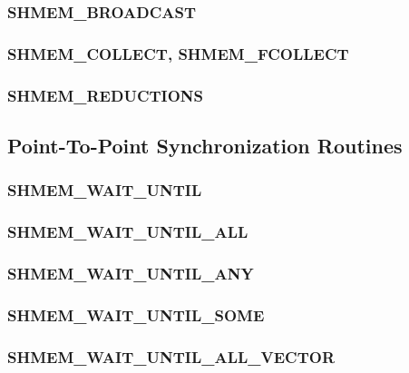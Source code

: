 \documentclass[10pt,oneside]{book}
\begin{document}
\subsubsection{\textbf{SHMEM\_BROADCAST}}\label{subsec:shmem_broadcast}


\subsubsection{\textbf{SHMEM\_COLLECT, SHMEM\_FCOLLECT}}\label{subsec:shmem_collect}


\subsubsection{\textbf{SHMEM\_REDUCTIONS}}\label{subsec:shmem_reductions}





\subsection{Point-To-Point Synchronization Routines}\label{subsec:p2p_intro}


\subsubsection{\textbf{SHMEM\_WAIT\_UNTIL}}\label{subsec:shmem_wait_until}


\subsubsection{\textbf{SHMEM\_WAIT\_UNTIL\_ALL}}\label{subsec:shmem_wait_until_all}


\subsubsection{\textbf{SHMEM\_WAIT\_UNTIL\_ANY}}\label{subsec:shmem_wait_until_any}


\subsubsection{\textbf{SHMEM\_WAIT\_UNTIL\_SOME}}\label{subsec:shmem_wait_until_some}


\subsubsection{\textbf{SHMEM\_WAIT\_UNTIL\_ALL\_VECTOR}}\label{subsec:shmem_wait_until_all_vector}

\end{document}
